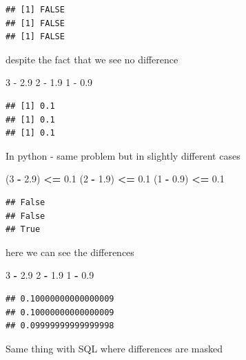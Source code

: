 \documentclass[
]{krantz}
\makeatletter
\newenvironment{Shaded}{\begin{snugshade}}{\end{snugshade}}
\newcommand{\DecValTok}[1]{\textcolor[rgb]{0.06,0.06,0.06}{#1}}
\newcommand{\FloatTok}[1]{\textcolor[rgb]{0.06,0.06,0.06}{#1}}
\newcommand{\NormalTok}[1]{#1}
\newcommand{\OperatorTok}[1]{\textcolor[rgb]{0.43,0.43,0.43}{\textbf{#1}}}
\newcommand{\SpecialCharTok}[1]{\textcolor[rgb]{0,0,0}{#1}}
\newenvironment{kframe}{%
\medskip{}
\setlength{\fboxsep}{.8em}
 \def\at@end@of@kframe{}%
 \ifinner\ifhmode%
  \def\at@end@of@kframe{\end{minipage}}%
  \begin{minipage}{\columnwidth}%
 \fi\fi%
 \def\FrameCommand##1{\hskip\@totalleftmargin \hskip-\fboxsep
 \colorbox{shadecolor}{##1}\hskip-\fboxsep
     \hskip-\linewidth \hskip-\@totalleftmargin \hskip\columnwidth}%
 \MakeFramed {\advance\hsize-\width
   \@totalleftmargin\z@ \linewidth\hsize
   \@setminipage}}%
 {\par\unskip\endMakeFramed%
 \at@end@of@kframe}
\renewenvironment{Shaded}{\begin{kframe}}{\end{kframe}}
\makeatother
\begin{document}
\begin{verbatim}
## [1] FALSE
## [1] FALSE
## [1] FALSE
\end{verbatim}

despite the fact that we see no difference

\begin{Shaded}
\begin{Highlighting}[]
\DecValTok{3} \SpecialCharTok{{-}} \FloatTok{2.9}
\DecValTok{2} \SpecialCharTok{{-}} \FloatTok{1.9}
\DecValTok{1} \SpecialCharTok{{-}} \FloatTok{0.9}
\end{Highlighting}
\end{Shaded}

\begin{verbatim}
## [1] 0.1
## [1] 0.1
## [1] 0.1
\end{verbatim}

In python - same problem but in slightly different cases

\begin{Shaded}
\begin{Highlighting}[]
\NormalTok{(}\DecValTok{3} \OperatorTok{{-}} \FloatTok{2.9}\NormalTok{) }\OperatorTok{\textless{}=} \FloatTok{0.1}
\NormalTok{(}\DecValTok{2} \OperatorTok{{-}} \FloatTok{1.9}\NormalTok{) }\OperatorTok{\textless{}=} \FloatTok{0.1}
\NormalTok{(}\DecValTok{1} \OperatorTok{{-}} \FloatTok{0.9}\NormalTok{) }\OperatorTok{\textless{}=} \FloatTok{0.1}
\end{Highlighting}
\end{Shaded}

\begin{verbatim}
## False
## False
## True
\end{verbatim}

here we can see the differences

\begin{Shaded}
\begin{Highlighting}[]
\DecValTok{3} \OperatorTok{{-}} \FloatTok{2.9}
\DecValTok{2} \OperatorTok{{-}} \FloatTok{1.9}
\DecValTok{1} \OperatorTok{{-}} \FloatTok{0.9}
\end{Highlighting}
\end{Shaded}

\begin{verbatim}
## 0.10000000000000009
## 0.10000000000000009
## 0.09999999999999998
\end{verbatim}

Same thing with SQL where differences are masked
\end{document}

